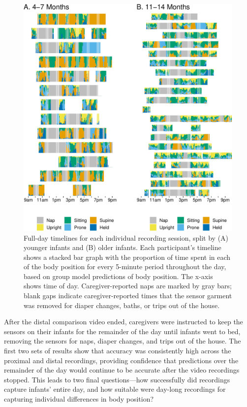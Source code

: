 \documentclass[
  man]{apa6}
\begin{document}
\begin{figure}

{\centering \includegraphics{manuscript_files/figure-latex/timelines-1} 

}

\caption{Full-day timelines for each individual recording session, split by (A) younger infants and (B) older infants. Each participant's timeline shows a stacked bar graph with the proportion of time spent in each of the body position for every 5-minute period throughout the day, based on group model predictions of body position. The x-axis shows time of day. Caregiver-reported naps are marked by gray bars; blank gaps indicate caregiver-reported times that the sensor garment was removed for diaper changes, baths, or trips out of the house.}\label{fig:timelines}
\end{figure}

After the distal comparison video ended, caregivers were instructed to keep the sensors on their infants for the remainder of the day until infants went to bed, removing the sensors for naps, diaper changes, and trips out of the house. The first two sets of results show that accuracy was consistently high across the proximal and distal recordings, providing confidence that predictions over the remainder of the day would continue to be accurate after the video recordings stopped. This leads to two final questions---how successfully did recordings capture infants' entire day, and how suitable were day-long recordings for capturing individual differences in body position?
\end{document}
